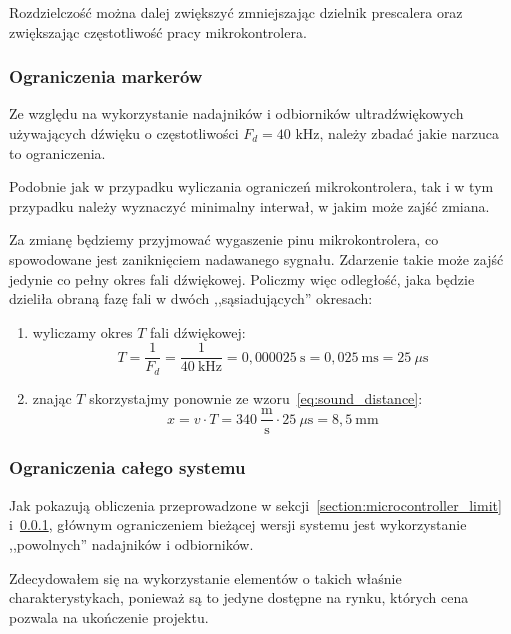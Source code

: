 Rozdzielczość można dalej zwiększyć zmniejszając dzielnik prescalera  oraz zwiększając częstotliwość pracy mikrokontrolera.

\subsubsection{Ograniczenia markerów}
\label{section:sound_limit}

Ze względu na wykorzystanie nadajników i odbiorników ultradźwiękowych używających dźwięku o częstotliwości $F_{d} = 40$ kHz, należy zbadać jakie narzuca to ograniczenia.

Podobnie jak w przypadku wyliczania ograniczeń mikrokontrolera, tak i w tym przypadku należy wyznaczyć minimalny interwał, w jakim może zajść zmiana.

Za zmianę będziemy przyjmować wygaszenie pinu mikrokontrolera, co spowodowane jest zaniknięciem nadawanego sygnału. Zdarzenie takie może zajść jedynie co pełny okres fali dźwiękowej. Policzmy więc odległość, jaka będzie dzieliła obraną fazę fali w dwóch ,,sąsiadujących'' okresach:

\begin{enumerate}
 \item wyliczamy okres $T$ fali dźwiękowej:
    \begin{equation}
      T = \frac{1}{F_d} = \frac{1}{40~\textrm{kHz}} = 0,000025~\textrm{s} = 0,025~\textrm{ms} = 25~\mu\textrm{s}
    \end{equation}
 \item znając $T$ skorzystajmy ponownie ze wzoru~\ref{eq:sound_distance}:
    \begin{equation}
      x = v \cdot T = 340~\frac{\textrm{m}}{\textrm{s}} \cdot 25~\mu\textrm{s} = 8,5~\textrm{mm}
      \label{eq:sound_limit}
    \end{equation}
\end{enumerate}

\subsubsection{Ograniczenia całego systemu}
Jak pokazują obliczenia przeprowadzone w sekcji~\ref{section:microcontroller_limit} i~\ref{section:sound_limit}, głównym ograniczeniem bieżącej wersji systemu jest wykorzystanie ,,powolnych'' nadajników i odbiorników.

Zdecydowałem się na wykorzystanie elementów  o takich właśnie charakterystykach, ponieważ są to jedyne dostępne na rynku, których cena pozwala na ukończenie projektu.

